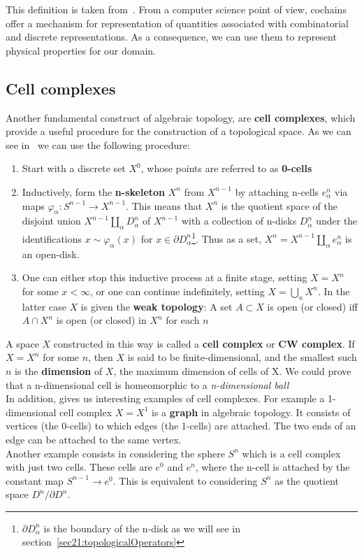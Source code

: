 This definition is taken from~\cite{Hatcher}.
From a computer science point of view, cochains offer a mechanism for representation of quantities associated with combinatorial and discrete representations. As a consequence, we can use them to represent physical properties for our domain.


\subsection{Cell complexes}

Another fundamental construct of algebraic topology, are \textbf{cell complexes}, which provide a useful procedure for the construction of a topological space. As we can see in~\cite{Hatcher} we can use the following procedure:
\begin{enumerate}
 \item Start with a discrete set $X^{0}$, whose points are referred to as \textbf{0-cells}
 \item Inductively, form the \textbf{n-skeleton} $X^{n}$ from $X^{n - 1}$ by attaching n-cells $e^{n}_{\alpha}$ via maps $\varphi_{\alpha} \colon S^{n-1} \rightarrow X^{n-1}$. This means that $X^{n}$ is the quotient space of the disjoint union $X^{n-1} \coprod_{\alpha}D^{n}_{\alpha}$ of $X^{n-1}$ with a collection of n-disks $D^{n}_{\alpha}$ under the identifications $x \sim  \varphi_{\alpha}(x)$ for $x \in \partial D^{n}_{\alpha}$\footnote{$\partial D^{n}_{\alpha}$ is the boundary of the n-disk as we will see in section~\ref{sec21:topologicalOperators}}. Thus as a set, $X^{n} = X^{n-1}\coprod_{\alpha}e^{n}_{\alpha}$ is an open-disk.
 \item One can either stop this inductive process at a finite stage, setting $X = X^{n}$ for some $x < \infty$, or one can continue indefinitely, setting $X = \bigcup_{n}X^{n}$. In the latter case $X$ is given the \textbf{weak topology}: A set $A \subset X$ is open (or closed) iff $A \cap X^{n}$ is open (or closed) in $X^{n}$ for each $n$
\end{enumerate}

A space $X$ constructed in this way is called a \textbf{cell complex} or \textbf{CW complex}. If $X = X^{n}$ for some $n$, then $X$ is said to be finite-dimensional, and the smallest such $n$ is the \textbf{dimension} of $X$, the maximum dimension of cells of X. We could prove that a n-dimensional cell is homeomorphic to a \textit{n-dimensional ball}\\

In addition, \cite{Hatcher} gives us interesting examples of cell complexes. For example a 1-dimensional cell complex $X = X^{1}$ is a \textbf{graph} in algebraic topology. It consists of vertices (the 0-cells) to which edges (the 1-cells) are attached. The two ends of an edge can be attached to the same vertex.\\
Another example consists in considering the sphere $S^{n}$ which is a cell complex with just two cells. These cells are $e^{0}$ and $e^{n}$, where the n-cell is attached by the constant map $S^{n-1} \rightarrow e^{0}$. This is equivalent to considering $S^{n}$ as the quotient space $D^{n}/\partial D^{n}$.\\

